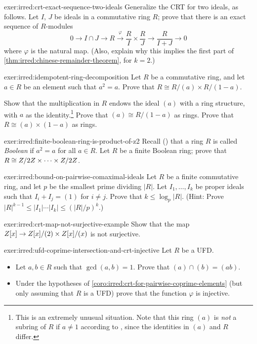 \begin{exer}{}{exer:irred:crt-exact-sequence-two-ideals}
  Generalize the CRT for two ideals, as follows. Let $I$, $J$ be
  ideals in a commutative ring $R$; prove that there is an exact
  sequence of $R$-modules
  \[0 \longrightarrow I \cap J \longrightarrow R
    \xrightarrow{\;\varphi\;} \frac{R}{I} \times \frac{R}{J}
    \longrightarrow \frac{R}{I + J} \longrightarrow 0\] where
  $\varphi$ is the natural map. (Also, explain why this implies the
  first part of \cref{thm:irred:chinese-remainder-theorem}, for $k = 2$.)
\end{exer}
\begin{exer}{}{exer:irred:idempotent-ring-decomposition}
  Let $R$ be a commutative ring, and let $a \in R$ be an element such
  that $a^2 = a$. Prove that $R \cong R/(a) \times R/(1 - a)$.

  Show that the multiplication in $R$ endows the ideal $(a)$ with a
  ring structure, with $a$ as the identity.\footnote{This is an
    extremely unusual situation. Note that this ring $(a)$ is
    \emph{not} a subring of $R$ if $a \neq 1$ according to
    , since the identities in $(a)$ and $R$
    differ.}  Prove that $(a) \cong R/(1 - a)$ as rings. Prove that
  $R \cong (a) \times (1 - a)$ as rings.
\end{exer}
\begin{exer}{}{exer:irred:finite-boolean-ring-is-product-of-z2}
  Recall () that a ring $R$ is
  called \emph{Boolean} if $a^2 = a$ for all $a \in R$. Let $R$ be a
  finite Boolean ring; prove that
  $R \cong Z/2Z \times \dots \times Z/2Z$.
\end{exer}
\begin{exer}{}{exer:irred:bound-on-pairwise-comaximal-ideals}
  Let $R$ be a finite commutative ring, and let $p$ be the smallest
  prime dividing $|R|$. Let $I_1, \dots, I_k$ be proper ideals such
  that $I_i + I_j = (1)$ for $i \neq j$. Prove that
  $k \leq \log_p |R|$. (Hint: Prove
  $|R|^{k-1} \leq |I_1| \cdots |I_k| \leq (|R|/p)^k$.)
\end{exer}
\begin{exer}{}{exer:irred:crt-map-not-surjective-example}
  Show that the map $Z[x] \to Z[x]/(2) \times Z[x]/(x)$ is not
  surjective.
\end{exer}
\begin{exer}{}{exer:irred:ufd-coprime-intersection-and-crt-injective}
  \exerused{}Let $R$ be a UFD.
  \begin{itemize}
  \item Let $a, b \in R$ such that $\gcd(a, b) = 1$. Prove that
    $(a) \cap (b) = (ab)$.
  \item Under the hypotheses of \cref{coro:irred:crt-for-pairwise-coprime-elements} (but only
    assuming that $R$ is a UFD) prove that the function $\varphi$ is
    injective.
  \end{itemize}
\end{exer}
